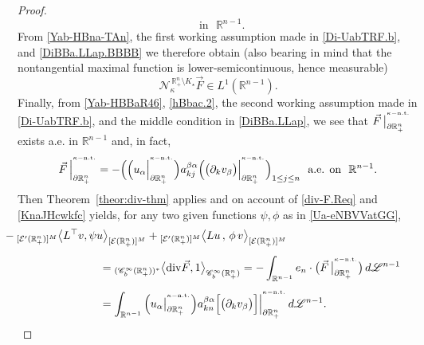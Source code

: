 \documentclass[11pt,reqno]{amsart}
\numberwithin{equation}{section}
\theoremstyle{remark}
\begin{document}
\begin{proof}
\begin{equation}
\,\,\text{ in }\,\,{\mathbb{R}}^{n-1}.
\end{equation}
%
From \eqref{Yab-HBna-TAn}, the first working assumption made in \eqref{Di-UabTRF.b}, and \eqref{DiBBa.LLap.BBBB}
we therefore obtain (also bearing in mind that the nontangential maximal function is lower-semicontinuous, hence 
measurable)
%
\begin{equation}\label{Yab-HBna-TAn.2}
{\mathcal{N}}^{\,\mathbb{R}^{n}_{+}\setminus K_\star}_{\kappa}\vec{F}\in L^1({\mathbb{R}}^{n-1}).
\end{equation}
%
Finally, from \eqref{Yab-HBBaR46}, \eqref{hBbac.2}, the second working assumption made in \eqref{Di-UabTRF.b}, 
and the middle condition in \eqref{DiBBa.LLap}, we see that
$\vec{F}\,\big|^{{}^{\kappa-{\rm n.t.}}}_{\partial\mathbb{R}^n_+}$
exists a.e. in ${\mathbb{R}}^{n-1}$ and, in fact, 
%
\begin{equation}\label{KnaJHcwkfc}
\vec{F}\,\Big|^{{}^{\kappa-{\rm n.t.}}}_{\partial\mathbb{R}^n_+}
=-\Big(\Big(u_\alpha\Big|^{{}^{\kappa-{\rm n.t.}}}_{\partial\mathbb{R}^n_+}\Big)
a^{\beta\alpha}_{kj}\Big(\big(\partial_k v_{\beta}\big)
\Big|^{{}^{\kappa-{\rm n.t.}}}_{\partial\mathbb{R}^n_+}\Big)_{1\leq j\le n}
\,\,\text{ a.e. on }\,\,{\mathbb{R}}^{n-1}.
\end{equation}
%
Then Theorem~\ref{theor:div-thm} applies and on account of \eqref{div-F.Req}
and \eqref{KnaJHcwkfc} yields, for any two given functions $\psi,\phi$ 
as in \eqref{Ua-eNBVVatGG},
%
\begin{align}\label{Uahg-ihGPPa4}
&\hskip -0.40in
-{}_{[{\mathcal{E}}'(\mathbb{R}^{n}_{+})]^M}\big\langle L^{\top}v,
\psi u\big\rangle_{[{\mathcal{E}}(\mathbb{R}^{n}_{+})]^M}
+{}_{[{\mathcal{E}}'(\mathbb{R}^{n}_{+})]^M}\big\langle Lu\,,\,
\phi\,v\big\rangle_{[{\mathcal{E}}(\mathbb{R}^{n}_{+})]^M}
\nonumber\\[4pt]
&\hskip 0.80in
={}_{(\mathscr{C}_b^\infty(\mathbb{R}^n_+))^*}\big\langle{\rm div}\vec{F},1
\big\rangle_{\mathscr{C}_b^\infty(\mathbb{R}^n_+)} 
=-\int_{\mathbb{R}^{n-1}}e_n\cdot
\big(\vec F\,\big|^{{}^{\kappa-{\rm n.t.}}}_{\partial\mathbb{R}^n_+}\bigr)\,d{\mathscr{L}}^{n-1}
\nonumber\\[4pt]
&\hskip 0.80in
=\int_{\mathbb{R}^{n-1}}
\Big(u_\alpha\big|_{\partial\mathbb{R}^{n}_{+}}^{{}^{\kappa-{\rm n.t.}}}\Big)a^{\beta\alpha}_{kn}
\Big[\big(\partial_k v_{\beta}\big)
\Big]\Big|_{\partial\mathbb{R}^{n}_{+}}^{{}^{\kappa-{\rm n.t.}}}\,d{\mathscr{L}}^{n-1}.
\end{align}


\end{proof}
\end{document}
